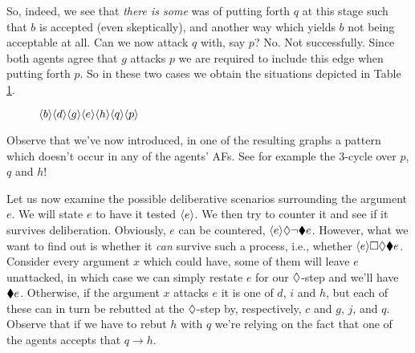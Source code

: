 \documentclass{llncs}
\begin{document}
So, indeed, we see that \emph{there is some} was of putting forth $q$ at this stage such that $b$ is accepted (even skeptically), and another way which yields $b$ not being acceptable at all. Can we now attack $q$ with, say $p$? No. Not successfully. Since both agents agree that $g$ attacks $p$ we are required to include this edge when putting forth $p$. So in these two cases we obtain the situations depicted in Table \ref{tbl:dynamism-3}.

\begin{figure}[ht]
  \centering
  \def\svgwidth{\textwidth}
  \begin{tiny}
    
  \end{tiny}
  \caption{$\langle{b}\rangle \langle{d}\rangle \langle{g}\rangle \langle{e}\rangle \langle{h}\rangle \langle{q}\rangle \langle{p}\rangle$}
  \label{tbl:dynamism-3}
\end{figure}

Observe that we've now introduced, in one of the resulting graphs a pattern which doesn't occur in any of the agents' AFs. See for example the 3-cycle over $p$, $q$ and $h$! 

Let us now examine the possible deliberative scenarios surrounding the argument $e$. We will state $e$ to have it tested $\langle{e}\rangle$. We then try to counter it and see if it survives deliberation. Obviously, $e$ can be countered, $\langle{e}\rangle \lozenge \neg \blacklozenge e$. However, what we want to find out is whether it \emph{can} survive such a process, i.e., whether $\langle{e}\rangle \square \lozenge \blacklozenge e$. Consider every argument $x$ which could have, some of them will leave $e$ unattacked, in which case we can simply restate $e$ for our $\lozenge$-step and we'll have $\blacklozenge e$. Otherwise, if the argument $x$ attacks $e$ it is one of $d$, $i$ and $h$, but each of these can in turn be rebutted at the $\lozenge$-step by, respectively, $c$ and $g$, $j$, and $q$. Observe that if we have to rebut $h$ with $q$ we're relying on the fact that one of the agents accepts that $q \longrightarrow h$. 



\end{document}
